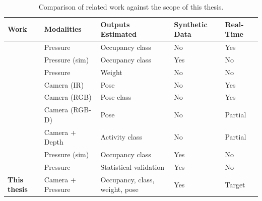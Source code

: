 \begin{table}[H]
\centering
\caption{Comparison of related work against the scope of this thesis.}
\label{tab:gap-analysis}
\begin{tabular}{@{}lllll@{}}
\toprule
\textbf{Work} & \textbf{Modalities} & \textbf{Outputs Estimated} & \textbf{Synthetic Data} & \textbf{Real-Time} \\
\midrule
\cite{mueller2019pressure} & Pressure & Occupancy class & No & Yes \\
\cite{clever2020bodiesrest3dhuman} & Pressure (sim) & Occupancy class & Yes & No \\
\cite{nakamura2021weight}  & Pressure & Weight & No & No \\
\cite{schmidt2020driver}   & Camera (IR) & Pose & No & Yes \\
\cite{patel2021occupant}   & Camera (RGB) & Pose class & No & Yes \\
\cite{kowalski2023rgbd}    & Camera (RGB-D) & Pose & No & Partial \\
\cite{oliveira2022crossmodal} & Camera + Depth & Activity class & No & Partial \\
\cite{ivanov2021synthetic} & Pressure (sim) & Occupancy class & Yes & No \\
\cite{lindqvist2023sim2real} & Pressure & Statistical validation & Yes & No \\
\textbf{This thesis} & Camera + Pressure & Occupancy, class, weight, pose & Yes & Target \\
\bottomrule
\end{tabular}
\end{table}
